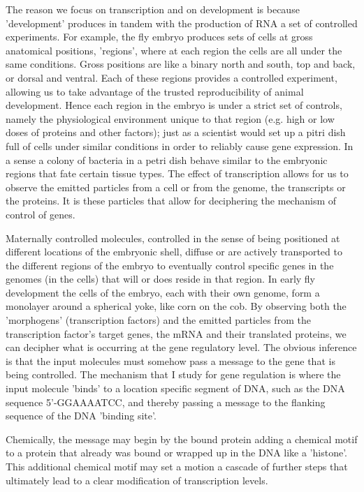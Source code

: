 The reason we focus on transcription and on development is because 'development' produces in tandem with the production of RNA a set of controlled experiments.  For example, the fly embryo produces sets of cells at gross anatomical positions, 'regions', where at each region the cells are all under the same conditions.  Gross positions are like a binary north and south, top and back, or dorsal and ventral.  Each of these regions provides a controlled experiment, allowing us to take advantage of the trusted reproducibility of animal development\cite{pmid17632062}.  Hence each region in the embryo is under a strict set of controls, namely the physiological environment unique to that region (e.g. high or low doses of proteins and other factors); just as a scientist would set up a pitri dish full of cells under similar conditions in order to reliably cause gene expression.  In a sense a colony of bacteria in a petri dish behave similar to the embryonic regions that fate certain tissue types.  The effect of transcription allows for us to observe the emitted particles from a cell or from the genome, the transcripts or the proteins.  It is these particles that allow for deciphering the mechanism of control of genes.   

  
Maternally controlled molecules, controlled in the sense of being positioned at different locations of the embryonic shell, diffuse or are actively transported to the different regions of the embryo to eventually control specific genes in the genomes (in the cells) that will or does reside in that region.  In early fly development the cells of the embryo, each with their own genome, form a monolayer around a spherical yoke, like corn on the cob.  By observing both the 'morphogens' (transcription factors) and the emitted particles from the transcription factor's target genes, the mRNA and their translated proteins, we can decipher what is occurring at the gene regulatory level.  The obvious inference is that the input molecules must somehow pass a message to the gene that is being controlled.  The mechanism that I study for gene regulation is where the input molecule 'binds' to a location specific segment of DNA, such as the DNA sequence 5'-GGAAAATCC, and thereby passing a message to the flanking sequence of the DNA 'binding site'.

Chemically, the message may begin by the bound protein adding a chemical motif to a protein that already was bound or wrapped up in the DNA like a 'histone'.  This additional chemical motif may set a motion a cascade of further steps that ultimately lead to a clear modification of transcription levels.
  

